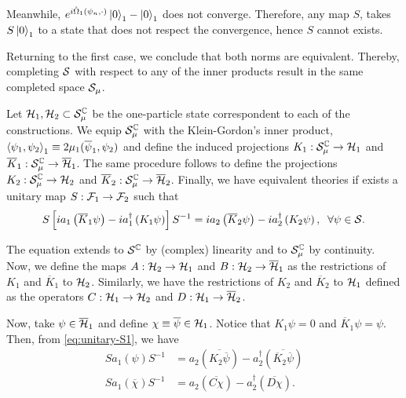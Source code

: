 Meanwhile, \(e^{i\hat{\Omega}_1(\psi_n,\cdot)}\ket{0}_1-\ket{0}_1\) does not converge. Therefore, any map \(S\), takes \(S\ket{0}_1\) to a state that does not respect the convergence, hence \(S\) cannot exists.

Returning to the first case, we conclude that both norms are equivalent. Thereby, completing \({\mathcal{S}}\) with respect to any of the inner products result in the same completed space \({\mathcal{S}}_\mu\). 

Let \({\mathcal{H}}_1,{\mathcal{H}}_2\subset{\mathcal{S}}_\mu^{\mathbb{C}}\) be the one-particle state correspondent to each of the constructions. We equip \({\mathcal{S}}_\mu^{\mathbb{C}}\) with the Klein-Gordon's inner product, \(\left\langle \psi_1, \psi_2\right\rangle_1\equiv 2\mu_1(\overline{\psi}_1,\psi_2)\) and define the induced projections \(K_1:{\mathcal{S}}_{\mu}^{\mathbb{C}}\to{\mathcal{H}}_1\) and \(\overline{K}_1:{\mathcal{S}}_\mu^{\mathbb{C}}\to\overline{{\mathcal{H}}}_1\). The same procedure follows to define the projections \(K_2:{\mathcal{S}}_{\mu}^{\mathbb{C}}\to{\mathcal{H}}_2\) and \(\overline{K}_2:{\mathcal{S}}_\mu^{\mathbb{C}}\to\overline{{\mathcal{H}}}_2\). Finally, we have equivalent theories if exists a unitary map \(S:{\mathcal{F}}_1\to{\mathcal{F}}_2\) such that
\begin{equation}\label{eq:unitary-S1}
    S\left[ia_1\left(\overline{K}_1\psi\right)-ia_1^\dagger\left(K_1\psi\right)\right]S^{-1}=ia_2\left(\overline{K}_2\psi\right)-ia_2^\dagger\left(K_2\psi\right),\;\;\forall\psi\in{\mathcal{S}}.
\end{equation}

The equation extends to \({\mathcal{S}}^{\mathbb{C}}\) by (complex) linearity and to \({\mathcal{S}}_\mu^{\mathbb{C}}\) by continuity. Now, we define the maps \(A:{\mathcal{H}}_2\to{\mathcal{H}}_1\) and \(B:{\mathcal{H}}_2\to\overline{{\mathcal{H}}}_1\) as the restrictions of \(K_1\) and \(\overline{K}_1\) to \({\mathcal{H}}_2\). Similarly, we have the restrictions of \(K_2\) and \(\overline{K}_2\) to \({\mathcal{H}}_1\) defined as the operators \(C:{\mathcal{H}}_1\to{\mathcal{H}}_2\) and \(D:{\mathcal{H}}_1\to\overline{{\mathcal{H}}}_2\).

Now, take \(\psi\in\overline{{\mathcal{H}}}_1\) and define \(\chi\equiv\overline{\psi}\in{\mathcal{H}}_1\). Notice that \(K_1\psi=0\) and \(\overline{K}_1\psi=\psi\). Then, from \cref{eq:unitary-S1}, we have
\begin{subequations}\label{eq:cond-S}
    \begin{align}
        Sa_1(\psi)S^{-1}&=a_2\left(\overline{K_2\overline{\psi}}\right)-a^{\dagger}_2\left(\overline{\overline{K}_2\overline{\psi}}\right)\\
        Sa_1(\overline{\chi})S^{-1}&=a_2\left(\overline{C\chi}\right)-a_2^{\dagger}\left(\overline{D\chi}\right).
    \end{align}
\end{subequations}

